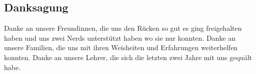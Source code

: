 \subsection{Danksagung}\label{fz_danksagung}
Danke an unsere Freundinnen, die uns den Rücken so gut es ging freigehalten haben und uns zwei Nerds unterstützt haben wo sie nur konnten.
Danke an unsere Familien, die uns mit ihren Weisheiten und Erfahrungen weiterhelfen konnten.
Danke an unsere Lehrer, die sich die letzten zwei Jahre mit uns gequält habe.